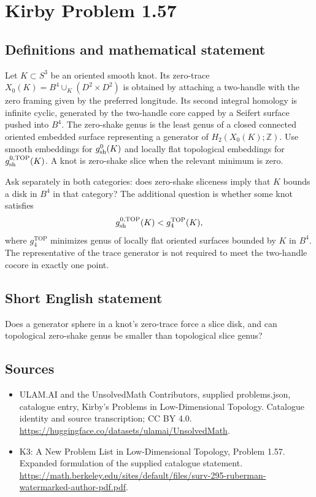\documentclass[11pt,a4paper]{article}
\begin{document}
\section*{Kirby Problem 1.57}\label{statement}

\subsection{Definitions and mathematical statement}
Let $K\subset S^3$ be an oriented smooth knot. Its zero-trace
$X_0(K)=B^4\cup_K(D^2\times D^2)$ is obtained by attaching a two-handle with
the zero framing given by the preferred longitude. Its second integral homology
is infinite cyclic, generated by the two-handle core capped by a Seifert surface
pushed into $B^4$.
The zero-shake genus is the least genus of a closed connected oriented embedded
surface representing a generator of $H_2(X_0(K);\mathbb Z)$. Use smooth
embeddings for $g^0_{\rm sh}(K)$ and locally flat topological embeddings for
$g^{0,\mathrm{TOP}}_{\rm sh}(K)$. A knot is zero-shake slice when the relevant
minimum is zero.

Ask separately in both categories: does zero-shake sliceness imply that $K$
bounds a disk in $B^4$ in that category? The additional question is whether some
knot satisfies
\[
g^{0,\mathrm{TOP}}_{\rm sh}(K)<g^{\mathrm{TOP}}_4(K),
\]
where $g^{\mathrm{TOP}}_4$ minimizes genus of locally flat oriented surfaces
bounded by $K$ in $B^4$. The representative of the trace generator is not
required to meet the two-handle cocore in exactly one point.
\subsection{Short English statement}
Does a generator sphere in a knot's zero-trace force a slice disk, and can topological zero-shake genus be smaller than topological slice genus?
\subsection{Sources}
\begin{itemize}
\item[S1] ULAM.AI and the UnsolvedMath Contributors, supplied problems.json, catalogue entry, Kirby's Problems in Low-Dimensional Topology. Catalogue identity and source transcription; CC BY 4.0.
\url{https://huggingface.co/datasets/ulamai/UnsolvedMath}.
\item[S2] K3: A New Problem List in Low-Dimensional Topology, Problem 1.57. Expanded formulation of the supplied catalogue statement.
\url{https://math.berkeley.edu/sites/default/files/surv-295-ruberman-watermarked-author-pdf.pdf}.
\end{itemize}
\end{document}
